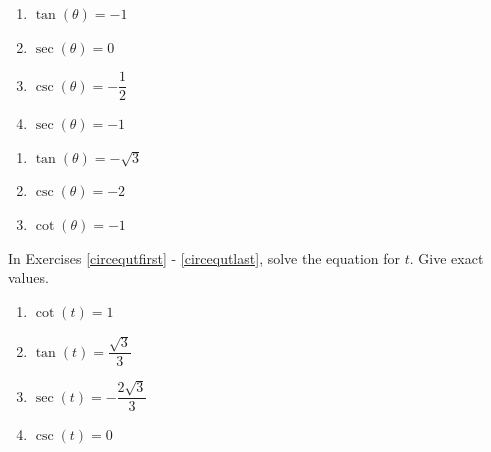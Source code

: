 \begin{multicols}{4}

\begin{enumerate}

\setcounter{enumi}{\value{HW}}

\item $\tan(\theta) = -1$ 
\item $\sec(\theta) = 0$ 
\item $\csc(\theta) = -\dfrac{1}{2}$
\item  $\sec(\theta) = -1$ 

\setcounter{HW}{\value{enumi}}

\end{enumerate}

\end{multicols}

\begin{multicols}{4}

\begin{enumerate}

\setcounter{enumi}{\value{HW}}

\item  $\tan(\theta) = -\sqrt{3}$
\item  $\csc(\theta) = -2$ 
\item  $\cot(\theta) = -1$  \label{circequanglelast}

\setcounter{HW}{\value{enumi}}

\end{enumerate}

\end{multicols}

In Exercises \ref{circequtfirst} - \ref{circequtlast}, solve the equation for $t$.  Give exact values.

\begin{multicols}{4}

\begin{enumerate}

\setcounter{enumi}{\value{HW}}

\item $\cot(t) = 1$  \label{circequtfirst}
\item  $\tan(t) = \dfrac{\sqrt{3}}{3}$ 
\item $\sec(t) = -\dfrac{2\sqrt{3}}{3}$
\item $\csc(t) = 0$  

\setcounter{HW}{\value{enumi}}

\end{enumerate}

\end{multicols}

